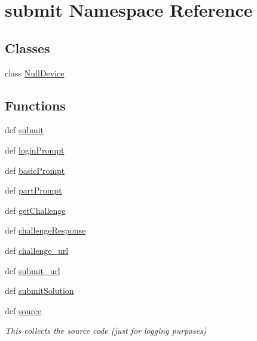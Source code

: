 \hypertarget{namespacesubmit}{\section{submit \-Namespace \-Reference}
\label{df/d89/namespacesubmit}
}
\subsection*{\-Classes}
\begin{DoxyCompactItemize}
\item 
class \hyperlink{classsubmit_1_1_null_device}{\-Null\-Device}
\end{DoxyCompactItemize}
\subsection*{\-Functions}
\begin{DoxyCompactItemize}
\item 
def \hyperlink{namespacesubmit_a642fc39a1a77a4e0df61147643ef4d50}{submit}
\item 
def \hyperlink{namespacesubmit_a128eea321a2e4940d0a5271289e0d723}{login\-Prompt}
\item 
def \hyperlink{namespacesubmit_a1ff6968d0bba393b1c07abf5634764b3}{basic\-Prompt}
\item 
def \hyperlink{namespacesubmit_ab35b99128622160955daf7490c1f3db9}{part\-Prompt}
\item 
def \hyperlink{namespacesubmit_a185118f14022b8d8300b05f583d03b67}{get\-Challenge}
\item 
def \hyperlink{namespacesubmit_a5be05cca6931f9edfbdb62728c072a4f}{challenge\-Response}
\item 
def \hyperlink{namespacesubmit_a719c7f9292fc667dc435c490ca896822}{challenge\-\_\-url}
\item 
def \hyperlink{namespacesubmit_a5f292efc47e28cfcb3337c7f87faf3e5}{submit\-\_\-url}
\item 
def \hyperlink{namespacesubmit_a786a591b2b4c09d9bd3e6cfd7312b20d}{submit\-Solution}
\item 
def \hyperlink{namespacesubmit_aeefe06af3c2212e4fdf82ca9e7154e2d}{source}
\begin{DoxyCompactList}\small\item\em \-This collects the source code (just for logging purposes) \end{DoxyCompactList}\end{DoxyCompactItemize}
